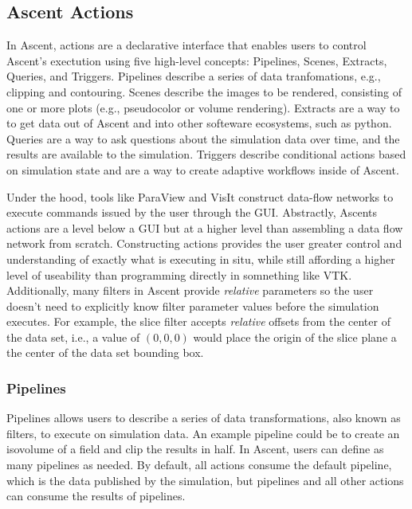 \subsection{Ascent Actions}
In Ascent, actions are a declarative interface that enables users to
control Ascent's exectution using five high-level concepts:
Pipelines, Scenes, Extracts, Queries, and Triggers.
%
Pipelines describe a series of data tranfomations, e.g.,
clipping and contouring.
%
Scenes describe the images to be rendered, consisting of one or more
plots (e.g., pseudocolor or volume rendering).
%
Extracts are a way to to get data out of Ascent and into other softeware
ecosystems, such as python.
%
Queries are a way to ask questions about the simulation data over time, and
the results are available to the simulation.
%
Triggers describe conditional actions based on simulation state and are a way
to create adaptive workflows inside of Ascent.

Under the hood, tools like ParaView and VisIt construct data-flow networks
to execute commands issued by the user through the GUI.
%
Abstractly, Ascents actions are a level below a GUI but at a higher level
than assembling a data flow network from scratch.
%
Constructing actions provides the user greater control and understanding
of exactly what is executing in situ, while still affording a higher level of
useability than programming directly in somnething like VTK.
%
Additionally, many filters in Ascent provide \textit{relative}
parameters so the user doesn't need to explicitly know filter parameter values
before the simulation executes.
%
For example, the slice filter accepts \textit{relative} offsets from the
center of the data set, i.e., a value of $(0,0,0)$ would place the origin
of the slice plane a the center of the data set bounding box.

\subsubsection{Pipelines}
Pipelines allows users to describe a series of data transformations, also known as
filters, to execute on simulation data.
%
An example pipeline could be to create an isovolume of a field
and clip the results in half.
%
In Ascent, users can define as many pipelines as needed.
%
By default, all actions consume the default pipeline, which is the data
published by the simulation, but pipelines and all other actions can consume
the results of pipelines.

